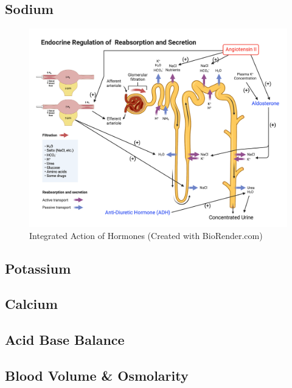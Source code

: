 \subsection{Sodium}
\begin{figure}[!h]
    \centering
    \includegraphics[width=1\linewidth]{./figure/Endocrine_Regulation.png}
    \caption{Integrated Action of Hormones \footnotesize{(Created with BioRender.com)}}
    \label{fig:Endocrine_Regulation}
\end{figure}
\subsection{Potassium}

\subsection{Calcium}

\subsection{Acid Base Balance}

\subsection{Blood Volume \& Osmolarity}

